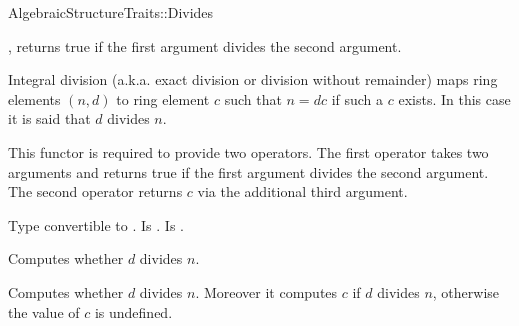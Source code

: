 \begin{ccRefFunctionObjectConcept}{AlgebraicStructureTraits::Divides}

\ccDefinition

, 
returns true if the first argument divides the second argument. 

Integral division (a.k.a. exact division or division without remainder) maps 
ring elements $(n,d)$ to ring element $c$ such that $n = dc$ if such a $c$ 
exists. In this case it is said that $d$ divides $n$. 

This functor is required to provide two operators. The first operator takes two
arguments and returns true if the first argument divides the second argument. 
The second operator returns $c$ via the additional third argument. 

\ccRefines 


\ccTypes
{} 
        { Type convertible to .}
\ccGlue
{} 
        { Is .}
\ccGlue
{} 
        { Is .}

\ccOperations
{}

        { Computes whether $d$ divides $n$. }

        { 
        Computes whether $d$ divides $n$.
        Moreover it computes $c$ if $d$ divides $n$, 
        otherwise the value of $c$ is undefined. 
        }


\ccSeeAlso


\end{ccRefFunctionObjectConcept} 
